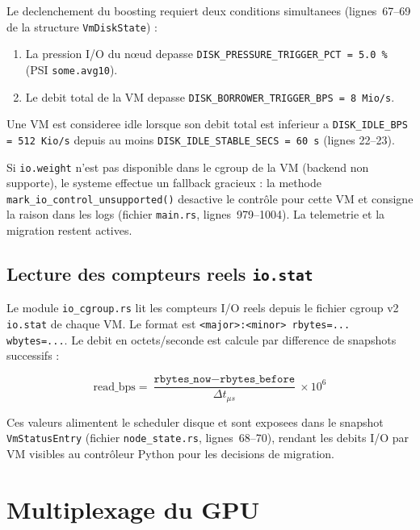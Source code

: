 Le declenchement du boosting requiert deux conditions simultanees (lignes~67--69 de la structure \texttt{VmDiskState}) :

\begin{enumerate}
    \item La pression I/O du n\oe{}ud depasse \texttt{DISK\_PRESSURE\_TRIGGER\_PCT = 5.0\,\%} (PSI \texttt{some.avg10}).
    \item Le debit total de la VM depasse \texttt{DISK\_BORROWER\_TRIGGER\_BPS = 8~Mio/s}.
\end{enumerate}

Une VM est consideree idle lorsque son debit total est inferieur a \texttt{DISK\_IDLE\_BPS = 512~Kio/s} depuis au moins \texttt{DISK\_IDLE\_STABLE\_SECS = 60~s} (lignes 22--23).

Si \texttt{io.weight} n'est pas disponible dans le cgroup de la VM (backend non supporte), le systeme effectue un fallback gracieux : la methode \texttt{mark\_io\_control\_unsupported()} desactive le contr\^ole pour cette VM et consigne la raison dans les logs (fichier \texttt{main.rs}, lignes~979--1004). La telemetrie et la migration restent actives.

\subsection{Lecture des compteurs reels \texttt{io.stat}}
\label{subsec:io-stat}

Le module \texttt{io\_cgroup.rs} lit les compteurs I/O reels depuis le fichier cgroup v2 \texttt{io.stat} de chaque VM. Le format est \texttt{<major>:<minor> rbytes=... wbytes=...}. Le debit en octets/seconde est calcule par difference de snapshots successifs :

\begin{equation}
    \text{read\_bps} = \frac{\texttt{rbytes\_now} - \texttt{rbytes\_before}}{\Delta t_{\mu s}} \times 10^6
\end{equation}

Ces valeurs alimentent le scheduler disque et sont exposees dans le snapshot \texttt{VmStatusEntry} (fichier \texttt{node\_state.rs}, lignes~68--70), rendant les debits I/O par VM visibles au contr\^oleur Python pour les decisions de migration.

\section{Multiplexage du GPU}
\label{sec:gpu-multiplexer}

